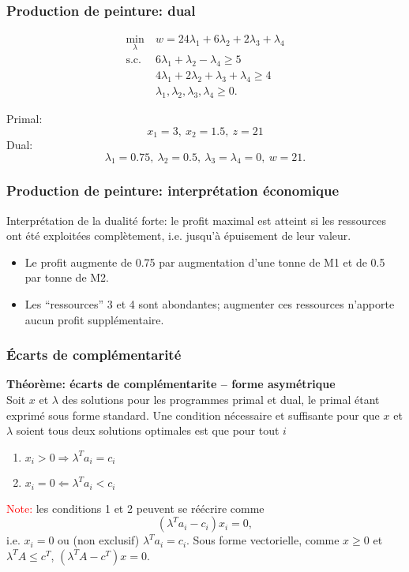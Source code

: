 \documentclass[usepdftitle=false]{beamer}
\begin{document}
\begin{frame}
\frametitle{Production de peinture: dual}

\begin{align*}
\min_\lambda \ & w = 24\lambda_1 + 6\lambda_2 + 2\lambda_3 + \lambda_4 \\
\mbox{s.c. } & 6\lambda_1 + \lambda_2 - \lambda_4 \geq 5 \\
&4\lambda_1 + 2\lambda_2 + \lambda_3 + \lambda_4 \geq 4 \\
& \lambda_1, \lambda_2, \lambda_3, \lambda_4 \geq 0.
\end{align*}

\mbox{}

Primal:
\[
x_1 = 3,\ x_2 = 1.5,\ z = 21
\]
Dual:
\[
\lambda_1 = 0.75,\ \lambda_2 = 0.5,\ \lambda_3 = \lambda_4 = 0,\ w = 21.
\]

\end{frame}

\begin{frame}
\frametitle{Production de peinture: interprétation économique}

Interprétation de la dualité forte: le profit maximal est atteint si les ressources ont été exploitées complètement, i.e. jusqu’à épuisement de leur valeur.

\mbox{}

\begin{itemize}
\item
Le profit augmente de 0.75 par augmentation d'une tonne de M1 et de 0.5 par tonne de M2.
\item
Les ``ressources'' 3 et 4 sont abondantes; augmenter ces ressources n'apporte aucun profit supplémentaire.
\end{itemize}

\end{frame}

\begin{frame}
\frametitle{\'Ecarts de complémentarité}

{\bf Théorème: écarts de complémentarite -- forme asymétrique}\\
Soit $x$ et $\lambda$ des solutions pour les programmes primal et dual, le primal étant exprimé sous forme standard. Une condition nécessaire et suffisante pour que $x$ et $\lambda$ soient tous deux solutions optimales est que pour tout $i$
\begin{enumerate}
\item
$x_i > 0 \Rightarrow \lambda^T a_i = c_i$
\item
$x_i = 0 \Leftarrow \lambda^T a_i < c_i$
\end{enumerate}

\mbox{}

\textcolor{red}{Note:} les conditions 1 et 2 peuvent se réécrire comme
$$
(\lambda^T a_i - c_i)x_i = 0,
$$
i.e. $x_i = 0$ ou (non exclusif) $\lambda^T a_i = c_i$. Sous forme vectorielle, comme $x \geq 0$ et $\lambda^T A \leq c^T$, $(\lambda^T A - c^T)x = 0$.

\end{frame}
\end{document}
